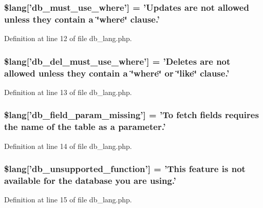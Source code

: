 \subsubsection[{\$lang}]{\setlength{\rightskip}{0pt plus 5cm}\$lang['db\-\_\-must\-\_\-use\-\_\-where'] = 'Updates are {\bf not} allowed unless they contain {\bf a} \char`\"{}where\char`\"{} clause.'}\label{db__lang_8php_add4bfc65af76fda2c48fa6a2e8d2e506}


Definition at line 12 of file db\-\_\-lang.\-php.

\subsubsection[{\$lang}]{\setlength{\rightskip}{0pt plus 5cm}\$lang['db\-\_\-del\-\_\-must\-\_\-use\-\_\-where'] = 'Deletes are {\bf not} allowed unless they contain {\bf a} \char`\"{}where\char`\"{} or \char`\"{}like\char`\"{} clause.'}\label{db__lang_8php_a256ae2de791e589ddc23012f74f390ea}


Definition at line 13 of file db\-\_\-lang.\-php.

\subsubsection[{\$lang}]{\setlength{\rightskip}{0pt plus 5cm}\$lang['db\-\_\-field\-\_\-param\-\_\-missing'] = 'To fetch fields requires the name of the table as {\bf a} parameter.'}\label{db__lang_8php_a9101352a8cd8c8f34a6b8b1e30c45d8a}


Definition at line 14 of file db\-\_\-lang.\-php.

\subsubsection[{\$lang}]{\setlength{\rightskip}{0pt plus 5cm}\$lang['db\-\_\-unsupported\-\_\-function'] = 'This feature is {\bf not} available {\bf for} the database you are using.'}\label{db__lang_8php_a77c256be8532e23e8463481f51732116}


Definition at line 15 of file db\-\_\-lang.\-php.

